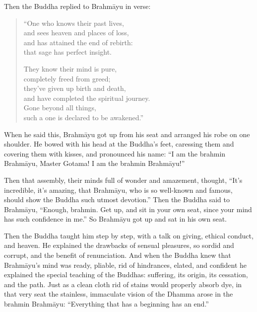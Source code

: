 \documentclass[12pt,openany]{book}%
\begin{document}
Then the Buddha replied to \textsanskrit{Brahmāyu} in verse: 

\begin{verse}%
“One who knows their past lives, \\
and sees heaven and places of loss, \\
and has attained the end of rebirth: \\
that sage has perfect insight. 

They know their mind is pure, \\
completely freed from greed; \\
they’ve given up birth and death, \\
and have completed the spiritual journey. \\
Gone beyond all things, \\
such a one is declared to be awakened.” 

%
\end{verse}

When he said this, \textsanskrit{Brahmāyu} got up from his seat and arranged his robe on one shoulder. He bowed with his head at the Buddha’s feet, caressing them and covering them with kisses, and pronounced his name: “I am the brahmin \textsanskrit{Brahmāyu}, Master Gotama! I am the brahmin \textsanskrit{Brahmāyu}!” 

Then that assembly, their minds full of wonder and amazement, thought, “It’s incredible, it’s amazing, that \textsanskrit{Brahmāyu}, who is so well-known and famous, should show the Buddha such utmost devotion.” Then the Buddha said to \textsanskrit{Brahmāyu}, “Enough, brahmin. Get up, and sit in your own seat, since your mind has such confidence in me.” So \textsanskrit{Brahmāyu} got up and sat in his own seat. 

Then the Buddha taught him step by step, with a talk on giving, ethical conduct, and heaven. He explained the drawbacks of sensual pleasures, so sordid and corrupt, and the benefit of renunciation. And when the Buddha knew that \textsanskrit{Brahmāyu}’s mind was ready, pliable, rid of hindrances, elated, and confident he explained the special teaching of the Buddhas: suffering, its origin, its cessation, and the path. Just as a clean cloth rid of stains would properly absorb dye, in that very seat the stainless, immaculate vision of the Dhamma arose in the brahmin \textsanskrit{Brahmāyu}: “Everything that has a beginning has an end.” 
\end{document}

